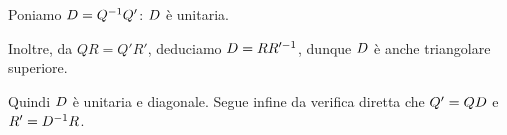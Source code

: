 \Proof Poniamo $D = Q^{-1}Q'$: $D$ \`e unitaria.
\par Inoltre, da $QR = Q'R'$, deduciamo $D = RR'^{-1}$, dunque
$D$ \`e anche triangolare superiore.
\par Quindi $D$ \`e unitaria e diagonale. Segue infine da
verifica diretta che
$Q' = QD$ e
$R' = D^{-1} R$. \EndProof
